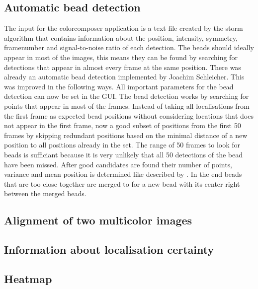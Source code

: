 \subsection{Automatic bead detection}
The input for the colorcomposer application is a text file created by the storm
algorithm that contains information about the position, intensity, symmetry,
framenumber and signal-to-noise ratio of each detection. The beads should
ideally appear in most of the images, this means they can be found by searching for
detections that appear in almost every frame at the same position.\newline
There was already an automatic bead detection implemented by Joachim Schleicher. This was improved in the following ways.\newline
All important parameters for the bead detection can now be set in the GUI. The bead detection works by searching for points that appear in most of the frames. Instead of taking all localisations from the first frame as expected bead positions without considering locations that does not appear in the first frame, now a good subset of positions from the first 50 frames by skipping redundant positions based on the minimal distance of a new position to all positions already in the set. The range of 50 frames to look for beads is sufficiant because it is very unlikely that all 50 detections of the bead have been missed.\newline
After good candidates are found their number of points, variance and mean position is determined like described by \cite{MAJoachim}.\newline
In the end beads that are too close together are merged to for a new bead with its center right between the merged beads.

\subsection{Alignment of two multicolor images}
\subsection{Information about localisation certainty}
\subsection{Heatmap}


